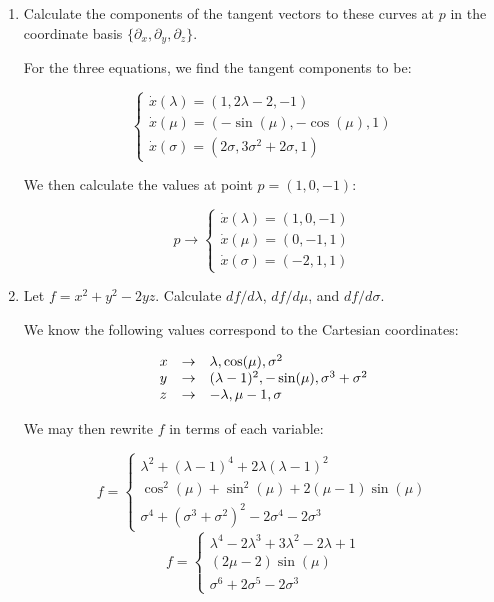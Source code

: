 \begin{enumerate}
\begin{enumerate}
      \item Calculate the components of the tangent vectors to these curves at $p$ in the coordinate basis $\{\partial_x, \partial_y, \partial_z \}$.

        For the three equations, we find the tangent components to be:

        $$\left\{\begin{array}{l} \dot{x}(\lambda)=(1,2\lambda-2,-1)\\\dot{x}(\mu)=(-\sin(\mu),-\cos(\mu),1)\\\dot{x}(\sigma)=(2\sigma,3\sigma^2+2\sigma,1)\end{array}$$

          We then calculate the values at point $p=(1,0,-1)$:

          $$p\to\left\{\begin{array}{l} \dot{x}(\lambda)=(1,0,-1)\\\dot{x}(\mu)=(0,-1,1)\\\dot{x}(\sigma)=(-2,1,1)\end{array}$$

      \item Let $f=x^2+y^2-2yz$. Calculate $df/d\lambda$, $df/d\mu$, and $df/d\sigma$.

        We know the following values correspond to the Cartesian coordinates:

        $$\begin{array}{l l l} x & \to & \lambda, \cos(\mu), \sigma^2\\ y & \to & (\lambda-1)^2,-\sin(\mu),\sigma^3+\sigma^2\\ z & \to & -\lambda,\mu-1,\sigma \end{array}$$

        We may then rewrite $f$ in terms of each variable:

        $$f=\left\{\begin{array}{l} \lambda^2+(\lambda-1)^4+2\lambda(\lambda-1)^2\\ \cos^2(\mu)+\sin^2(\mu)+2(\mu-1)\sin(\mu)\\\sigma^4+(\sigma^3+\sigma^2)^2-2\sigma^4-2\sigma^3\end{array}$$
        $$f=\left\{\begin{array}{l} \lambda^4-2\lambda^3+3\lambda^2-2\lambda+1\\ (2\mu-2)\sin(\mu)\\\sigma^6+2\sigma^5-2\sigma^3\end{array}$$


\end{enumerate}
\end{enumerate}
